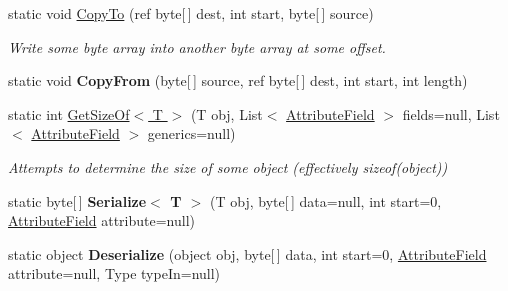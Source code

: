 \begin{DoxyCompactItemize}
\item 
static void \hyperlink{class_skyrates_1_1_common_1_1_network_1_1_bit_serialize_attribute_a052fde3e3f5b74b5a87405bae98a9a82}{Copy\-To} (ref byte\mbox{[}$\,$\mbox{]} dest, int start, byte\mbox{[}$\,$\mbox{]} source)
\begin{DoxyCompactList}\small\item\em Write some byte array into another byte array at some offset. \end{DoxyCompactList}\item 
\hypertarget{class_skyrates_1_1_common_1_1_network_1_1_bit_serialize_attribute_a7894d6399ae5c2a062573bfe151c1ced}{static void {\bfseries Copy\-From} (byte\mbox{[}$\,$\mbox{]} source, ref byte\mbox{[}$\,$\mbox{]} dest, int start, int length)}\label{class_skyrates_1_1_common_1_1_network_1_1_bit_serialize_attribute_a7894d6399ae5c2a062573bfe151c1ced}

\item 
static int \hyperlink{class_skyrates_1_1_common_1_1_network_1_1_bit_serialize_attribute_a45ac1b652220847483b344647204e3c5}{Get\-Size\-Of$<$ T $>$} (T obj, List$<$ \hyperlink{class_skyrates_1_1_common_1_1_network_1_1_bit_serialize_attribute_1_1_attribute_field}{Attribute\-Field} $>$ fields=null, List$<$ \hyperlink{class_skyrates_1_1_common_1_1_network_1_1_bit_serialize_attribute_1_1_attribute_field}{Attribute\-Field} $>$ generics=null)
\begin{DoxyCompactList}\small\item\em Attempts to determine the size of some object (effectively sizeof(object)) \end{DoxyCompactList}\item 
\hypertarget{class_skyrates_1_1_common_1_1_network_1_1_bit_serialize_attribute_a5eddcab1354989e16d673082f9654776}{static byte\mbox{[}$\,$\mbox{]} {\bfseries Serialize$<$ T $>$} (T obj, byte\mbox{[}$\,$\mbox{]} data=null, int start=0, \hyperlink{class_skyrates_1_1_common_1_1_network_1_1_bit_serialize_attribute_1_1_attribute_field}{Attribute\-Field} attribute=null)}\label{class_skyrates_1_1_common_1_1_network_1_1_bit_serialize_attribute_a5eddcab1354989e16d673082f9654776}

\item 
\hypertarget{class_skyrates_1_1_common_1_1_network_1_1_bit_serialize_attribute_a43d63ebe5d2143df7339de12859b2c1f}{static object {\bfseries Deserialize} (object obj, byte\mbox{[}$\,$\mbox{]} data, int start=0, \hyperlink{class_skyrates_1_1_common_1_1_network_1_1_bit_serialize_attribute_1_1_attribute_field}{Attribute\-Field} attribute=null, Type type\-In=null)}\label{class_skyrates_1_1_common_1_1_network_1_1_bit_serialize_attribute_a43d63ebe5d2143df7339de12859b2c1f}


\end{DoxyCompactItemize}
